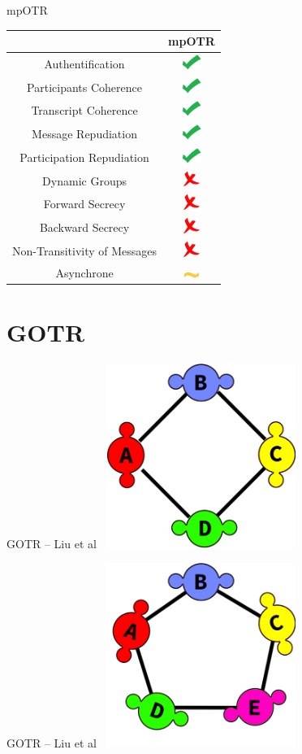 \documentclass{beamer}
\newcommand{\okay}{\includegraphics[height=0.5cm]{img/check.png}}
\newcommand{\nope}{\includegraphics[height=0.5cm]{img/cross.png}}
\newcommand{\sortof}{\includegraphics[width=0.5cm]{img/tilde.png}}
\begin{document}
\begin{frame}{mpOTR}
	\center
  	\begin{tabular}{c|c}
			                              & mpOTR \\
			\hline
  		Authentification              & \okay \\
  		\hline
  		Participants Coherence        & \okay \\
  		Transcript Coherence          & \okay \\
  		\hline
  		Message Repudiation           & \okay \\
  		Participation Repudiation     & \okay \\
  		\hline
  		Dynamic Groups                & \nope \\
  		\hline
  		Forward Secrecy               & \nope \\
  		Backward Secrecy              & \nope \\
  		Non-Transitivity of Messages  & \nope \\
  		\hline
  		Asynchrone                    & \sortof 
    \end{tabular}
\end{frame}


\section{GOTR}
\begin{frame}{GOTR – Liu et al~\cite{gotr}}
	\center
	\includegraphics[height=6cm]{img/group_ring4.png}
\end{frame}

\begin{frame}{GOTR – Liu et al~\cite{gotr}}
	\center
	\includegraphics[height=6cm]{img/group_ring5.png}
\end{frame}
\end{document}
